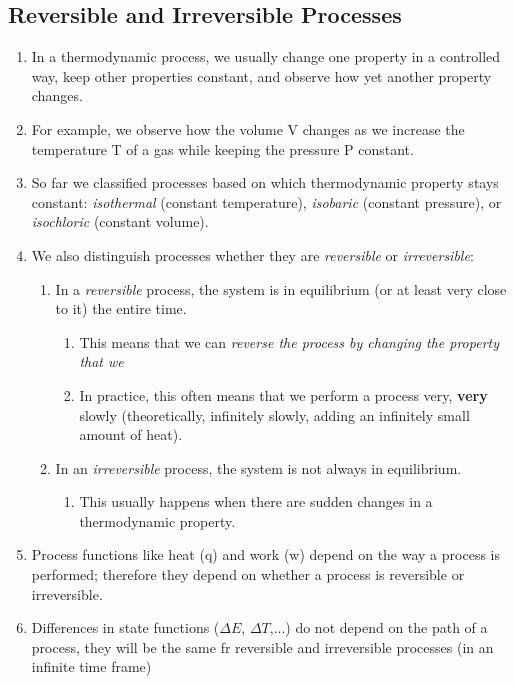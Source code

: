 \documentclass{article}  %
\begin{document}
\subsection*{Reversible and Irreversible Processes}
\begin{enumerate}
    \item In a thermodynamic process, we usually change one property in a controlled way, keep other properties constant, and observe how yet another property changes.
    \item For example, we observe how the volume V changes as we increase the temperature T of a gas while keeping the pressure P constant. 
    \item So far we classified processes based on which thermodynamic property stays constant: \emph{isothermal} (constant temperature), \emph{isobaric} (constant pressure), or \emph{isochloric} (constant volume).
    \item We also distinguish processes whether they are \emph{reversible} or \emph{irreversible}:
        \begin{enumerate}
            \item In a \emph{reversible} process, the system is in equilibrium (or at least very close to it) the entire time.
                \begin{enumerate}
                    \item This means that we can \emph{reverse the process by changing the property that we }
                    \item In practice, this often means that we perform a process very, \textbf{very} slowly (theoretically, infinitely slowly, adding an infinitely small amount of heat).
                \end{enumerate}
            \item In an \emph{irreversible} process, the system is not always in equilibrium. 
                \begin{enumerate}
                    \item This usually happens when there are sudden changes in a thermodynamic property.
                \end{enumerate}
        \end{enumerate} 
    \item Process functions like heat (q) and work (w) depend on the way a process is performed; therefore they depend on whether a process is reversible or irreversible. 
    \item Differences in state functions ($\Delta E$, $\Delta T$,...) do not depend on the path of a process, they will be the same fr reversible and irreversible processes (in an infinite time frame)
\end{enumerate}
\end{document}
